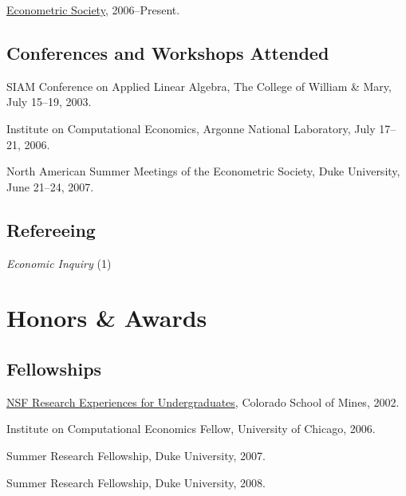 \documentclass[letterpaper]{article}
\renewenvironment{itemize}{
  \begin{list}{}{
    \setlength{\leftmargin}{1em}
  }
}{
  \end{list}
}
\begin{document}
\begin{itemize}
\item \href{http://www.econometricsociety.org/}{Econometric Society},
  2006--Present.
\end{itemize}

\subsection*{Conferences and Workshops Attended}

\begin{itemize}
\item SIAM Conference on Applied Linear Algebra,
  The College of William \& Mary,
  July 15--19, 2003.
\item Institute on Computational Economics,
  Argonne National Laboratory,
  July 17--21, 2006.
\item North American Summer Meetings of the Econometric Society,
  Duke University,
  June 21--24, 2007.
\end{itemize}

\subsection*{Refereeing}

\begin{itemize}
\item \textit{Economic Inquiry} (1)
\end{itemize}


\section*{Honors \& Awards}

\subsection*{Fellowships}

\begin{itemize}
\item \href{http://www.nsf.gov/crssprgm/reu/}{NSF Research Experiences
    for Undergraduates}, Colorado School of Mines, 2002.
\item Institute on Computational Economics Fellow, University of Chicago, 2006.
\item Summer Research Fellowship, Duke University, 2007.
\item Summer Research Fellowship, Duke University, 2008.
\end{itemize}
\end{document}
